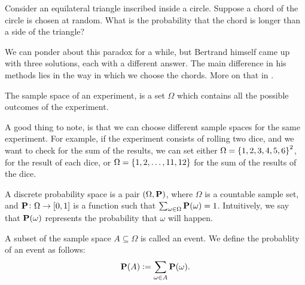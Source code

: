 \documentclass[11pt,a4paper]{article}
\begin{document}
\begin{paradox}
  \label{par:ber}
  Consider an equilateral triangle inscribed inside a circle. 
  Suppose a chord of the circle is chosen at random. 
  What is the probability that the chord is longer than a side of the 
  triangle? 
\end{paradox}

\begin{remark}
  We can ponder about this paradox for a while, but Bertrand himself came up
  with three solutions, each with a different answer. The main difference in
  his methods lies in the way in which we choose the chords.
  More on that in .
\end{remark}

\begin{definition}
  The sample space of an experiment, is a set $\Omega$ which contains all
  the possible outcomes of the experiment.
\end{definition}

\begin{remark}
  A good thing to note, is that we can choose different sample spaces for the
  same experiment. For example, if the experiment consists of rolling two
  dice, and we want to check for the sum of the results, we can set either
  $\Omega = \left\{1,2,3,4,5,6\right\}^2$, for the result of each dice, or 
  $\Omega = \left\{1,2,\dots,11,12\right\}$ for the sum of the results of the dice. 
\end{remark}

\begin{definition}
  A discrete probability space is a pair $(\Omega, \mathbf{P})$, where
  $\Omega$ is a countable sample set, and $\mathbf{P} \colon \Omega \to 
  [0,1]$ is a function such that 
  $\sum_{\omega \in \Omega}{\mathbf{P}(\omega)} = 1$. 
  Intuitively, we say that $\mathbf{P}(\omega)$ represents the probability
  that $\omega$ will happen.
\end{definition}
\begin{definition}[Event]
  A subset of the sample space $A \subseteq \Omega$ is called an event.
  We define the probablity of an event as follows:
  \[
    \mathbf{P}(A) := \sum_{\omega \in A}{\mathbf{P}(\omega)}.
  \]
\end{definition}
\end{document}
